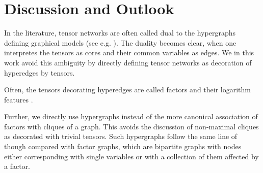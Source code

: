 \section{Discussion and Outlook}

\begin{remark}
	In the literature, tensor networks are often called dual to the hypergraphs defining graphical models (see e.g. \cite{robeva_duality_2019}).
	The duality becomes clear, when one interpretes the tensors as cores and their common variables as edges.
	We in this work avoid this ambiguity by directly defining tensor networks as decoration of hyperedges by tensors.
	
	Often, the tensors decorating hyperedges are called factors and their logarithm features \cite{koller_probabilistic_2009}.
	
	Further, we directly use hypergraphs instead of the more canonical association of factors with cliques of a graph.
	This avoids the discussion of non-maximal cliques as decorated with trivial tensors.
	Such hypergraphs follow the same line of though compared with factor graphs, which are bipartite graphs with nodes either corresponding with single variables or with a collection of them affected by a factor.
\end{remark}








